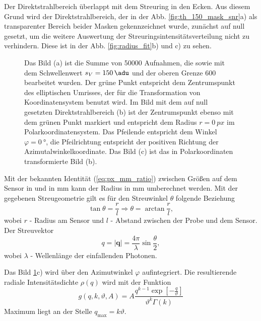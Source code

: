 \noindent
Der Direktstrahlbereich überlappt mit dem Streuring in den Ecken. Aus diesem Grund wird der Direktstrahlbereich, der in der Abb. \ref{fig:th_150_mask_snr}a) als transparenter Bereich beider Masken gekennzeichnet wurde, zunächst auf null gesetzt, um die weitere Auswertung der Streuringsintensitätsverteilung nicht zu verhindern. Diese ist in der Abb. \ref{fig:radius_fit}b) und c) zu sehen.
\begin{figure}[H]
    \centering
    
    \caption{Das Bild (a) ist die Summe von \num{50000} Aufnahmen, die sowie mit dem Schwellenwert $s_V = \SI{150}{\adu}$ und der oberen Grenze \SI{600}{\adu} bearbeitet wurden. Der grüne Punkt entspricht dem Zentrumspunkt des elliptischen Umrisses, der für die Transformation von Koordinatensystem benutzt wird. Im Bild mit dem auf null gesetzten Direktstrahlbereich (b) ist der Zentrumspunkt ebenso mit dem grünen Punkt markiert und entspricht dem Radius $r=\SI{0}{px}$ im Polarkoordinatensystem. Das Pfeilende entspricht dem Winkel $\varphi = \SI{0}{\degree}$, die Pfeilrichtung entspricht der positiven Richtung der Azimutalwinkelkoordinate. Das Bild (c) ist das in Polarkoordinaten transformierte Bild (b).}
    \label{fig:th-150-200-maske-radial-transform}
\end{figure}
\noindent
Mit der bekannten Identität (\ref{eq:px_mm_ratio}) zwischen Größen auf dem Sensor in \si{\px} und in \si{\milli\meter} kann der Radius in \si{\milli\meter} umberechnet werden. Mit der gegebenen Streugeometrie gilt es für den Streuwinkel $\theta$  folgende Beziehung
\begin{equation}
    \tan{\theta} = \frac{r}{l} \Rightarrow \theta = \arctan \frac{r}{l},
\end{equation}
wobei $r$ - Radius am Sensor und $l$ - Abstand zwischen der Probe und dem Sensor. Der Streuvektor
\begin{equation}
    q = \left|\mathbf{q}\right| = \frac{4\pi}{\lambda}\sin{\frac{\theta}{2}},
\end{equation}
wobei $\lambda$ - Wellenlänge der einfallenden Photonen. 


\noindent
Das Bild \ref{fig:th-150-200-maske-radial-transform}c) wird über den Azimutwinkel $\varphi$ aufintegriert. Die resultierende radiale Intensitätsdichte $\rho(q)$ wird mit der Funktion
\cite{bagschik_employing_2016}
\begin{equation}
    g(q, k, \vartheta, A) = A\frac{q^{k-1}\exp\left[-\frac{q}{\vartheta}\right]}{\vartheta^k\Gamma(k)}
\end{equation}
Maximum liegt an der Stelle $q_\text{max} = k\vartheta$.

